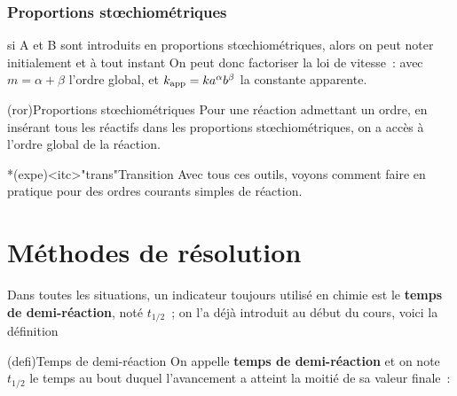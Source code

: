 \documentclass[../../main/main.tex]{subfiles}
\begin{document}
\subsubsection{Proportions stœchiométriques}
\smallbreak
\noindent
si A et B sont introduits en proportions stœchiométriques, alors on peut
noter initialement
\psw{
	\[
		[{\ce{A}}]_0 = ac_0
		\qet
		[{\ce{B}}]_0 = bc_0
	\]
}
et à tout instant
\psw{
	\[
		\boxed{
			[{\ce{R}}_1] = a (c_0 - x)
			\qet
			[{\ce{R}}_2] = b (c_0 - x)
		}
	\]
}
On peut donc factoriser la loi de vitesse~:
avec $m = \alpha + \beta$ l'ordre global, et $k_{\rm app} =
	ka^{\alpha}b^{\beta}$ la constante apparente.

\begin{tcb}[label=prop:stoe, bld, cnt](ror){Proportions stœchiométriques}
	Pour une réaction admettant un ordre, en insérant tous les réactifs dans les
	proportions stœchiométriques, on a accès à l'ordre global de la réaction.
\end{tcb}

\begin{tcb}*(expe)<itc>"trans"{Transition}
	Avec tous ces outils, voyons comment faire en pratique pour des ordres
	courants simples de réaction.
\end{tcb}

\section{Méthodes de résolution}

Dans toutes les situations, un indicateur toujours utilisé en chimie est le
\textbf{temps de demi-réaction}, noté $t_{1/2}$~; on l'a déjà introduit au début
du cours, voici la définition

\begin{tcb}[label=def:tundemi](defi){Temps de demi-réaction}
	On appelle \textbf{temps de demi-réaction} et on note $t_{1/2}$ le temps au
	bout duquel l'avancement a atteint la moitié de sa valeur finale~:
	\psw{
		\[\boxed{\xi(t_{1/2}) = \frac{\xi_f}{2}}\]
	}
\end{tcb}
\end{document}
